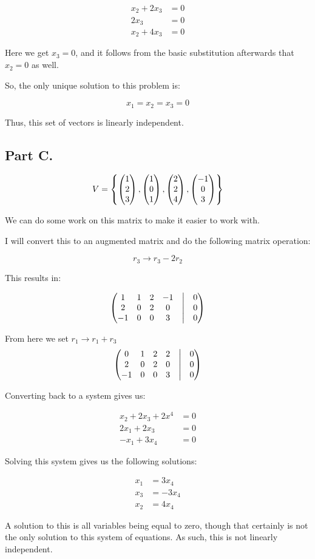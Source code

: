 \[
	\begin{aligned}
	x_2 + 2x_3 &= 0 \\
	2x_3 &= 0 \\
	x_2 + 4x_3 &= 0
	\end{aligned}
\]

Here we get $x_3 = 0$, and it follows from the basic substitution afterwards that $x_2 = 0$ as well. 

So, the only unique solution to this problem is:

\[x_1 = x_2 = x_3 = 0\]

Thus, this set of vectors is linearly independent. 

\pagebreak
\subsection*{Part C.}

\[
V = 
\left\{	
	 \begin{pmatrix} 1\\2\\3 \end{pmatrix} ,
	 \begin{pmatrix} 1\\0\\1 \end{pmatrix} ,
	 \begin{pmatrix} 2\\2\\4 \end{pmatrix} ,
	 \begin{pmatrix} -1\\0\\3 \end{pmatrix} 
\right\}
\]

We can do some work on this matrix to make it easier to work with. 

I will convert this to an augmented matrix and do the following matrix operation:

\[
r_3 \to r_3 - 2r_2
\]

This results in:

\[
	 \begin{pmatrix} 
		1&1&2&-1 &\bigm| & 0 \\
		2&0&2&0 &\bigm| & 0\\
		-1&0&0&3 &\bigm| & 0
	 \end{pmatrix} 
\]

From here we set $r_1 \to r_1 + r_3$
\[
	 \begin{pmatrix} 
		0&1&2&2 &\bigm| & 0\\
		2&0&2&0 &\bigm| & 0\\
		-1&0&0&3&\bigm| & 0
	 \end{pmatrix} 
\]

Converting back to a system gives us:

\[
	\begin{aligned}
		x_2 + 2x_3 + 2x^4 &= 0 \\
		2x_1 + 2x_3 &= 0 \\
		-x_1 + 3x_4 &= 0
	\end{aligned}
\]

Solving this system gives us the following solutions:

\[
	\begin{aligned}
		x_1 &= 3x_4 \\
		x_3 &= -3x_4 \\
		x_2 &= 4x_4
	\end{aligned}
\]

A solution to this is all variables being equal to zero, though that certainly is not the only solution to this system of equations. As such, this is not linearly independent. 
